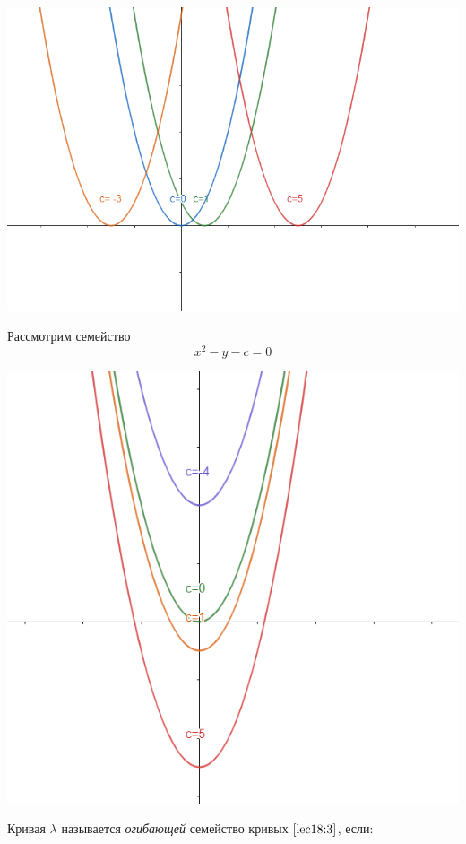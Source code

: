 \documentclass[../../main.tex]{subfiles}
\begin{document}
\begin{center} \includegraphics[scale=0.8]{first_family.png} \end{center}

Рассмотрим семейство 
\[ x^2 - y - c = 0 \]

\begin{center} \includegraphics[scale=0.8]{second_family.png} \end{center}

Кривая $\lambda$ называется \emph{огибающей} семейство кривых 
$\eqref{lec18:3}$, если:
\end{document}
